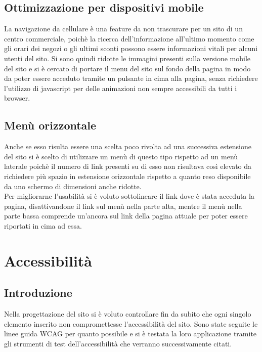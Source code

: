 \documentclass[a4paper,12pt]{article}
\begin{document}
\subsection{Ottimizzazione per dispositivi mobile}
La navigazione da cellulare è una feature da non trascurare per un sito di un centro commerciale, poichè la ricerca dell'informazione all'ultimo momento come gli orari dei negozi o gli ultimi sconti possono essere informazioni vitali per alcuni utenti del sito. Si sono quindi ridotte le immagini presenti sulla versione mobile del sito e si è cercato di portare il menu del sito sul fondo della pagina in modo da poter essere acceduto tramite un pulsante in cima alla pagina, senza richiedere l'utilizzo di javascript per delle animazioni non sempre accessibili da tutti i browser.
\subsection{Menù orizzontale}
Anche se esso risulta essere una scelta poco rivolta ad una successiva estensione del sito si è scelto di utilizzare un menù di questo tipo rispetto ad un menù laterale poichè il numero di link presenti su di esso non risultava così elevato da richiedere più spazio in estensione orizzontale rispetto a quanto reso disponibile da uno schermo di dimensioni anche ridotte.\\
Per migliorarne l'usabilità si è voluto sottolineare il link dove è stata acceduta la pagina, disattivandone il link sul menù nella parte alta, mentre il menù nella parte bassa comprende un'ancora sul link della pagina attuale per poter essere riportati in cima ad essa.
\section{Accessibilità}
\subsection{Introduzione}
Nella progettazione del sito si è voluto controllare fin da subito che ogni singolo elemento inserito non compromettesse l'accessibilità del sito. Sono state seguite le linee guida WCAG per quanto possibile e si è testata la loro applicazione tramite gli strumenti di test dell'accessibilità che verranno successivamente citati.
\end{document}
